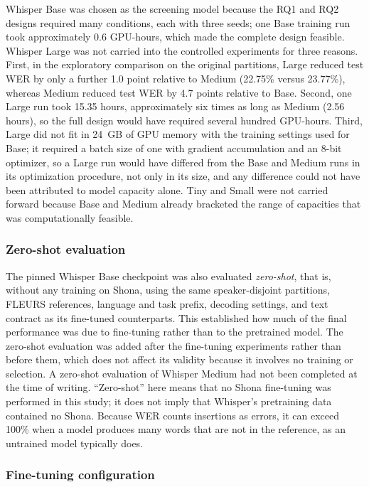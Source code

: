 Whisper Base was chosen as the screening model because the RQ1 and RQ2 designs
required many conditions, each with three seeds; one Base training run took
approximately 0.6 GPU-hours, which made the complete design feasible. Whisper
Large was not carried into the controlled experiments for three reasons. First,
in the exploratory comparison on the original partitions, Large reduced test WER by
only a further 1.0 point relative to Medium (22.75\% versus 23.77\%), whereas
Medium reduced test WER by 4.7 points relative to Base. Second, one Large run took
15.35 hours, approximately six times as long as Medium (2.56 hours), so the full
design would have required several hundred GPU-hours. Third, Large did not fit in
24~GB of GPU memory with the training settings used for Base; it required a batch
size of one with gradient accumulation and an 8-bit optimizer, so a Large run
would have differed from the Base and Medium runs in its optimization procedure,
not only in its size, and any difference could not have been attributed to model
capacity alone. Tiny and Small were not carried forward because Base and Medium
already bracketed the range of capacities that was computationally feasible.

\subsubsection{Zero-shot evaluation}

The pinned Whisper Base checkpoint was also evaluated \emph{zero-shot}, that is,
without any training on Shona, using the same speaker-disjoint partitions,
FLEURS references, language and task prefix, decoding settings, and text
contract as its fine-tuned counterparts. This established how much of the final
performance was due to fine-tuning rather than to the pretrained model. The
zero-shot evaluation was added after the fine-tuning experiments rather than
before them, which does not affect its validity because it involves no training
or selection. A zero-shot evaluation of Whisper Medium had not been completed at
the time of writing. 
``Zero-shot'' here means that no Shona fine-tuning was performed in this study;
it does not imply that Whisper's pretraining data contained no Shona. Because WER counts insertions as errors, it can
exceed 100\% when a model produces many words that are not in the reference, as
an untrained model typically does.

\subsubsection{Fine-tuning configuration}
\label{sec:finetuning}

